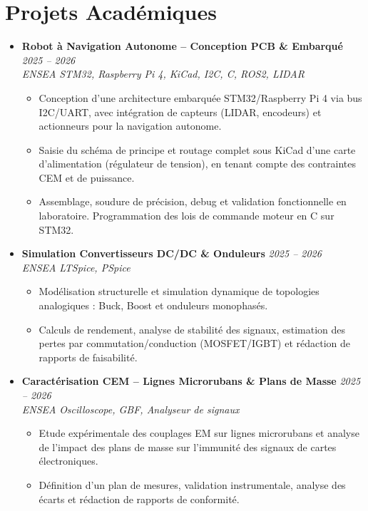 \documentclass[a4paper,11pt]{article}
\begin{document}
\section{Projets Académiques}
\begin{itemize}[leftmargin=*, label={-}, itemsep=1pt]

\item \textbf{Robot à Navigation Autonome -- Conception PCB \& Embarqué} \hfill \textit{2025 -- 2026} \\
\textit{ENSEA} \hfill \textit{STM32, Raspberry Pi 4, KiCad, I2C, C, ROS2, LIDAR}
\vspace{-2pt}
    \begin{itemize}[leftmargin=0.4cm, nosep, label=\tiny$\bullet$]
        \item \small{Conception d'une architecture embarquée STM32/Raspberry Pi 4 via bus I2C/UART, avec intégration de capteurs (LIDAR, encodeurs) et actionneurs pour la navigation autonome.}
        \item \small{Saisie du schéma de principe et routage complet sous KiCad d'une carte d'alimentation (régulateur de tension), en tenant compte des contraintes CEM et de puissance.}
        \item \small{Assemblage, soudure de précision, debug et validation fonctionnelle en laboratoire. Programmation des lois de commande moteur en C sur STM32.}
    \end{itemize}

\item \textbf{Simulation Convertisseurs DC/DC \& Onduleurs} \hfill \textit{2025 -- 2026} \\
\textit{ENSEA} \hfill \textit{LTSpice, PSpice}
\vspace{-2pt}
    \begin{itemize}[leftmargin=0.4cm, nosep, label=\tiny$\bullet$]
        \item \small{Modélisation structurelle et simulation dynamique de topologies analogiques : Buck, Boost et onduleurs monophasés.}
        \item \small{Calculs de rendement, analyse de stabilité des signaux, estimation des pertes par commutation/conduction (MOSFET/IGBT) et rédaction de rapports de faisabilité.}
    \end{itemize}

\item \textbf{Caractérisation CEM -- Lignes Microrubans \& Plans de Masse} \hfill \textit{2025 -- 2026} \\
\textit{ENSEA} \hfill \textit{Oscilloscope, GBF, Analyseur de signaux}
\vspace{-2pt}
    \begin{itemize}[leftmargin=0.4cm, nosep, label=\tiny$\bullet$]
        \item \small{Etude expérimentale des couplages EM sur lignes microrubans et analyse de l'impact des plans de masse sur l'immunité des signaux de cartes électroniques.}
        \item \small{Définition d'un plan de mesures, validation instrumentale, analyse des écarts et rédaction de rapports de conformité.}
    \end{itemize}


\end{itemize}
\end{document}
